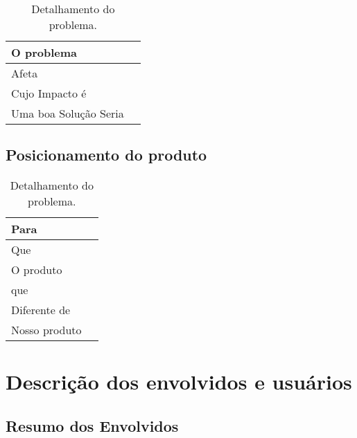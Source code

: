 \begin{appendices}
	\begin{table}[htb]
    \begin{tabular}{|l|l|}
        \hline
        O problema          & {\parbox{12cm}{}}                                        \\ \hline
        Afeta          & {\parbox{12cm}{}}                                                \\ \hline
        Cujo Impacto é            & {\parbox{12cm}{}}                                                                \\ 
        Uma boa Solução Seria             & {\parbox{12cm}{}}                         \\ \hline
    \end{tabular}
    \caption{Detalhamento do problema.}
    \end{table}


\subsection{Posicionamento do produto}

	\begin{table}[htb]
    \begin{tabular}{|l|l|}
        \hline
        Para          & {\parbox{12cm}{}}                                        \\ \hline
        Que          & {\parbox{12cm}{}}                                                \\ \hline
        O produto            & {\parbox{12cm}{}}                                                                \\ 
        que             & {\parbox{12cm}{}}                         \\ \hline
        Diferente de             & {\parbox{12cm}{}}                         \\ \hline
        Nosso produto             & {\parbox{12cm}{}}                         \\ \hline
    \end{tabular}
    \caption{Detalhamento do problema.}
    \end{table}

\section{Descrição dos envolvidos e usuários}

\subsection{Resumo dos Envolvidos}


\end{appendices}
